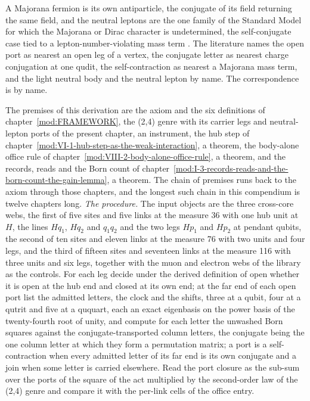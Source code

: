 \begin{chbridge}A Majorana fermion is its own antiparticle, the conjugate of its field returning the same field, and the neutral leptons are the one family of the Standard Model for which the Majorana or Dirac character is undetermined, the self-conjugate case tied to a lepton-number-violating mass term \cite{Majorana1937,Weinberg1979}. The literature names the open port as nearest an open leg of a vertex, the conjugate letter as nearest charge conjugation at one qudit, the self-contraction as nearest a Majorana mass term, and the light neutral body and the neutral lepton by name. The correspondence is by name.\end{chbridge}
\begin{chproof}
The premises of this derivation are the axiom and the six definitions of chapter~\ref{mod:FRAMEWORK}, the (2,4) genre with its carrier legs and neutral-lepton ports of the present chapter, an instrument, the hub step of chapter~\ref{mod:VI-1-hub-step-as-the-weak-interaction}, a theorem, the body-alone office rule of chapter~\ref{mod:VIII-2-body-alone-office-rule}, a theorem, and the records, reads and the Born count of chapter~\ref{mod:I-3-records-reads-and-the-born-count-the-gain-lemma}, a theorem. The chain of premises runs back to the axiom through those chapters, and the longest such chain in this compendium is twelve chapters long.
\textit{The procedure.} The input objects are the three cross-core webs, the first of five sites and five links at the measure 36 with one hub unit at $H$, the lines $Hq_{1}$, $Hq_{2}$ and $q_{1}q_{2}$ and the two legs $Hp_{1}$ and $Hp_{2}$ at pendant qubits, the second of ten sites and eleven links at the measure 76 with two units and four legs, and the third of fifteen sites and seventeen links at the measure 116 with three units and six legs, together with the muon and electron webs of the library as the controls. For each leg decide under the derived definition of open whether it is open at the hub end and closed at its own end; at the far end of each open port list the admitted letters, the clock and the shifts, three at a qubit, four at a qutrit and five at a ququart, each an exact eigenbasis on the power basis of the twenty-fourth root of unity, and compute for each letter the unwashed Born squares against the conjugate-transported column letters, the conjugate being the one column letter at which they form a permutation matrix; a port is a self-contraction when every admitted letter of its far end is its own conjugate and a join when some letter is carried elsewhere. Read the port closure as the sub-sum over the ports of the square of the act multiplied by the second-order law of the (2,4) genre and compare it with the per-link cells of the office entry.

\end{chproof}

